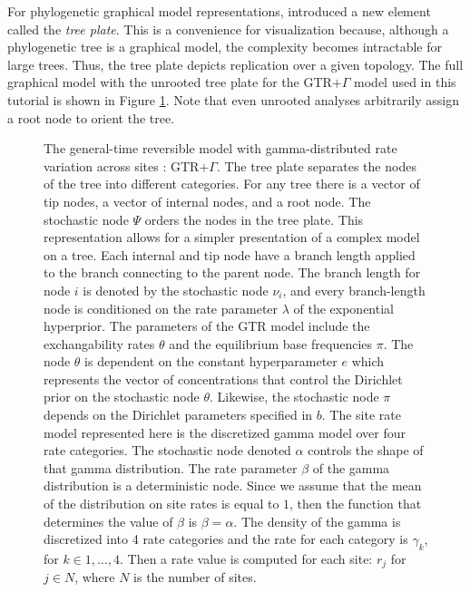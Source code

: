 \documentclass[11pt]{article}
\begin{document}
For phylogenetic graphical model representations, \citet{hoehnaGM2014} introduced a new element called the \textit{tree plate}. 
This is a convenience for visualization because, although a phylogenetic tree is a graphical model, the complexity becomes intractable for large trees. 
Thus, the tree plate depicts replication over a given topology. 
The full graphical model with the unrooted tree plate for the GTR$+\Gamma$ model used in this tutorial is shown in Figure \ref{gtrgmfig}. Note that even unrooted analyses arbitrarily assign a root node to orient the tree.
\begin{figure}[h!]
\centering
{}
\caption{\small  The general-time reversible model \citep{tavare86} with gamma-distributed rate variation across sites \citep{yang94a}: GTR$+\Gamma$. 
The tree plate separates the nodes of the tree into different categories. For any tree there is a vector of tip nodes, a vector of internal nodes, and a root node. 
The stochastic node $\Psi$ orders the nodes in the tree plate. This representation allows for a simpler presentation of a complex model on a tree.
Each internal and tip node have a branch length applied to the branch connecting to the parent node. The branch length for node $i$ is denoted by the stochastic node $\nu_i$, and every branch-length node is conditioned on the rate parameter $\lambda$ of the exponential hyperprior.
The parameters of the GTR model include the exchangability rates $\theta$ and the equilibrium base frequencies $\pi$. 
The node $\theta$ is dependent on the constant hyperparameter $e$ which represents the vector of concentrations that control the Dirichlet prior on the stochastic node $\theta$.
Likewise, the stochastic node $\pi$ depends on the Dirichlet parameters specified in $b$.
The site rate model represented here is the discretized gamma model over four rate categories.
The stochastic node denoted $\alpha$ controls the shape of that gamma distribution.
The rate parameter $\beta$ of the gamma distribution is a deterministic node. Since we assume that the mean of the distribution on site rates is equal to $1$, then the function that determines the value of $\beta$ is $\beta = \alpha$.
The density of the gamma is discretized into 4 rate categories and the rate for each category is $\gamma_k$, for $k \in {1,\ldots,4}$. 
Then a rate value is computed for each site: $r_j$ for $j \in N$, where $N$ is the number of sites. 
}
\label{gtrgmfig}
\end{figure}
\end{document}
